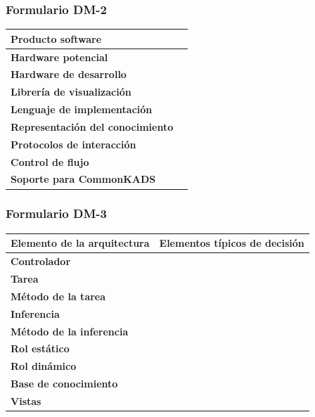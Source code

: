 \documentclass[a4paper,11pt]{article}
\begin{document}
			\subsubsection{Formulario DM-2}
			\begin{center}
				\begin{tabular}{| l | l |}
					\hline
					\textbf{Producto software} &  \\
					\hline
					\textbf{Hardware potencial} & \\
					\hline
					\textbf{Hardware de desarrollo} & \\
					\hline
					\textbf{Librería de visualización} & \\
					\hline
					\textbf{Lenguaje de implementación} &  \\
					\hline
					\textbf{Representación del conocimiento} & \\
					\hline
					\textbf{Protocolos de interacción} & \\
					\hline
					\textbf{Control de flujo} & \\
					\hline
					\textbf{Soporte para CommonKADS} & \\
					\hline
				\end{tabular}
			\end{center}
			\subsubsection{Formulario DM-3}
			\begin{center}
				\begin{tabular}{| l | l |}
					\hline
					\textbf{Elemento de la arquitectura} & \textbf{Elementos típicos de
					decisión} \\
					\hline
					\textbf{Controlador} & \\
					\hline
					\textbf{Tarea} & \\
					\hline
					\textbf{Método de la tarea} & \\
					\hline
					\textbf{Inferencia} &  \\
					\hline
					\textbf{Método de la inferencia} & \\
					\hline
					\textbf{Rol estático} & \\
					\hline
					\textbf{Rol dinámico} & \\
					\hline
					\textbf{Base de conocimiento} & \\
					\hline
					\textbf{Vistas} & \\
					\hline
				\end{tabular}
			\end{center}
\end{document}
